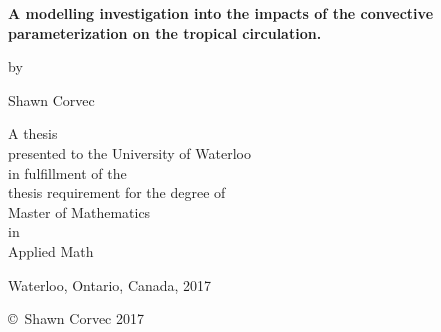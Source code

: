 \pagestyle{empty}

\begin{titlepage}
        \begin{center}
        \vspace*{1.0cm}

        \Huge
        {\bf{A modelling investigation into the impacts of the convective parameterization on the tropical circulation.} }

        \vspace*{1.0cm}

        \normalsize
        by \\

        \vspace*{1.0cm}

        \Large
        Shawn Corvec\\

        \vspace*{3.0cm}

        \normalsize
        A thesis \\
        presented to the University of Waterloo \\ 
        in fulfillment of the \\
        thesis requirement for the degree of \\
        Master of Mathematics \\
        in \\
        Applied Math \\

        \vspace*{2.0cm}

        Waterloo, Ontario, Canada, 2017 \\

        \vspace*{1.0cm}

        \copyright\ Shawn Corvec 2017 \\
        \end{center}
\end{titlepage}

\pagestyle{plain}
\setcounter{page}{2}

